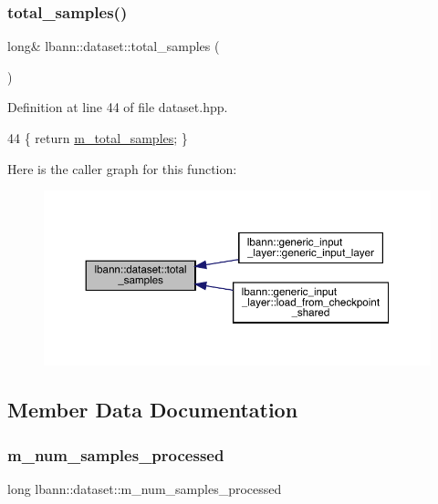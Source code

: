 \subsubsection{\texorpdfstring{total\+\_\+samples()}{total\_samples()}}
{\footnotesize\ttfamily long\& lbann\+::dataset\+::total\+\_\+samples (\begin{DoxyParamCaption}{ }\end{DoxyParamCaption})\hspace{0.3cm}{\ttfamily [inline]}}



Definition at line 44 of file dataset.\+hpp.


\begin{DoxyCode}
44 \{ \textcolor{keywordflow}{return} \hyperlink{classlbann_1_1dataset_a2bfe72a2783e0a47e725e91dfb13d06a}{m\_total\_samples}; \}
\end{DoxyCode}
Here is the caller graph for this function\+:\nopagebreak
\begin{figure}[H]
\begin{center}
\leavevmode
\includegraphics[width=350pt]{classlbann_1_1dataset_ab951c879f151990613567e985fe1e278_icgraph}
\end{center}
\end{figure}


\subsection{Member Data Documentation}
\mbox{\label{classlbann_1_1dataset_a68f4120cc4a7837e6a95b01358210cb5}} 
\subsubsection{\texorpdfstring{m\+\_\+num\+\_\+samples\+\_\+processed}{m\_num\_samples\_processed}}
{\footnotesize\ttfamily long lbann\+::dataset\+::m\+\_\+num\+\_\+samples\+\_\+processed\hspace{0.3cm}{\ttfamily [protected]}}



